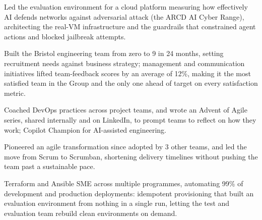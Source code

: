\begin{tightemize}
    \item Led the evaluation environment for a cloud platform measuring how effectively AI defends networks against adversarial attack (the ARCD AI Cyber Range), architecting the real-VM infrastructure and the guardrails that constrained agent actions and blocked jailbreak attempts.
    \item Built the Bristol engineering team from zero to 9 in 24 months, setting recruitment needs against business strategy; management and communication initiatives lifted team-feedback scores by an average of 12\%, making it the most satisfied team in the Group and the only one ahead of target on every satisfaction metric.
    \item Coached DevOps practices across project teams, and wrote an Advent of Agile series, shared internally and on LinkedIn, to prompt teams to reflect on how they work; Copilot Champion for AI-assisted engineering.
    \item Pioneered an agile transformation since adopted by 3 other teams, and led the move from Scrum to Scrumban, shortening delivery timelines without pushing the team past a sustainable pace.
    \item Terraform and Ansible SME across multiple programmes, automating 99\% of development and production deployments: idempotent provisioning that built an evaluation environment from nothing in a single run, letting the test and evaluation team rebuild clean environments on demand.
\end{tightemize}
\fi
\sectionsep{}
\vfill{}
